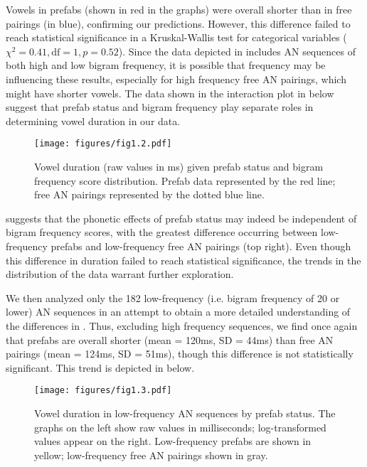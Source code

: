 \documentclass[output=paper]{langscibook}
\begin{document}
Vowels in prefabs (shown in red in the graphs) were overall shorter than in free pairings (in blue), confirming our predictions. However, this difference failed to reach statistical significance in a Kruskal-Wallis test for categorical variables ($\chi^2 = 0.41, \text{df} = 1, p = 0.52$). Since the data depicted in  includes AN sequences of both high and low bigram frequency, it is possible that frequency may be influencing these results, especially for high frequency free AN pairings, which might have shorter vowels. The data shown in the interaction plot in  below suggest that prefab status and bigram frequency play separate roles in determining vowel duration in our data.


\begin{figure}
\texttt{[image: figures/fig1.2.pdf]}
\caption{\label{fig:bybee:2}Vowel duration (raw values in ms) given prefab status and bigram frequency score distribution. Prefab data represented by the red line; free AN pairings represented by the dotted blue line.}
\end{figure}

 suggests that the phonetic effects of prefab status may indeed be independent of bigram frequency scores, with the greatest difference occurring between low-frequency prefabs and low-frequency free AN pairings (top right). Even though this difference in duration failed to reach statistical significance, the trends in the distribution of the data warrant further exploration.

We then analyzed only the 182 low-frequency (i.e. bigram frequency of 20 or lower) AN sequences in an attempt to obtain a more detailed understanding of the differences in . Thus, excluding high frequency sequences, we find once again that prefabs are overall shorter (mean = 120ms, SD = 44ms) than free AN pairings (mean = 124ms, SD = 51ms), though this difference is not statistically significant. This trend is depicted in  below.

\begin{figure}

\texttt{[image: figures/fig1.3.pdf]}

\caption{\label{fig:bybee:3}Vowel duration in low-frequency AN sequences by prefab status. The graphs on the left show raw values in milliseconds; log-transformed values appear on the right. Low-frequency prefabs are shown in yellow; low-frequency free AN pairings shown in gray.}
\end{figure}
\end{document}
